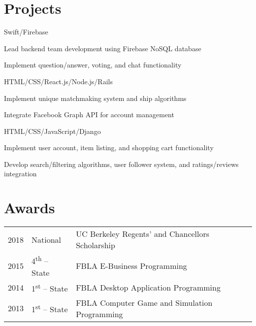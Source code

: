 \documentclass[]{deedy-resume}
\begin{document}
\begin{minipage}[t]{0.66\textwidth}

\section{Projects}

\begin{tightemize}
    \item Swift/Firebase
    \item Lead backend team development using Firebase NoSQL database
    \item Implement question/answer, voting, and chat functionality
\end{tightemize}
\sectionsep{}

\begin{tightemize}
  \item HTML/CSS/React.js/Node.js/Rails
  \item Implement unique matchmaking system and ship algorithms
  \item Integrate Facebook Graph API for account management
\end{tightemize}
\sectionsep{}

\begin{tightemize}
  \item HTML/CSS/JavaScript/Django
  \item Implement user account, item listing, and shopping cart functionality
  \item Develop search/filtering algorithms, user follower system, and ratings/reviews integration
\end{tightemize}
\sectionsep{}


\section{Awards}
\begin{tabular}{rll}
2018 & National & UC Berkeley Regents' and Chancellors Scholarship\\
2015 & 4\textsuperscript{th} – State & FBLA E-Business Programming\\
2014 & 1\textsuperscript{st} – State & FBLA Desktop Application Programming\\
2013 & 1\textsuperscript{st} – State & FBLA Computer Game and Simulation Programming
\end{tabular}
\sectionsep{}

\end{minipage}
\end{document}
